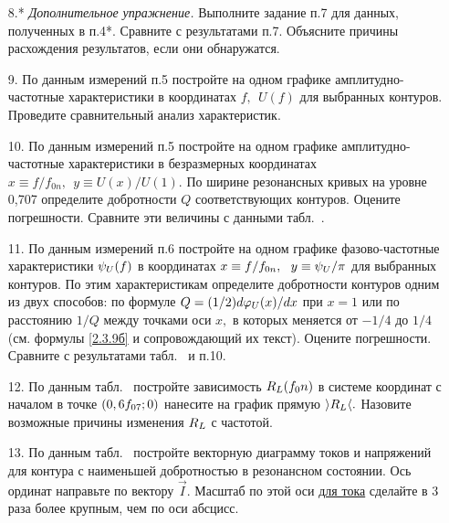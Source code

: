 \begin{lab:task}
\begin{enumerate}
Оцените относительный вклад активных потерь в конденсаторах, представленных в табл.~. сопротивлением $R_{\sc{S}\text{max}},$ рассчитанным для максимального значения $\tg\delta=10^{-3},$ в суммарное активное сопротивление контура.

\item[8.*] \emph{Дополнительное упражнение.} Выполните задание п.7 для данных, полученных в п.4*. Сравните с результатами п.7. Объясните причины расхождения результатов, если они обнаружатся.

\item[9.] По данным измерений п.5 постройте на одном графике амплитудно-частотные характеристики в координатах $f,~~U(f)$   для выбранных контуров. Проведите сравнительный анализ характеристик.

\item[10.] По данным измерений п.5 постройте на одном графике амплитудно-частотные характеристики в безразмерных координатах $x\equiv f/f_{0n},~~y\equiv U(x)/U(1).$ По ширине резонансных кривых на уровне 0,707 определите добротности $Q$ соответствующих контуров. Оцените погрешности. Сравните эти величины с данными табл.~.

\item[11.] По данным измерений п.6 постройте на одном графике фазово-частотные характеристики $\psi_{\sc{U}}(f)$ в координатах $x\equiv f/f_{0n},~~y\equiv\psi_{\sc{U}}/\pi$ для выбранных контуров. По этим характеристикам определите добротности контуров одним из двух способов: по формуле $Q=(1/2)d\varphi_{\sc{U}}(x)/dx$ при $x=1$ или по расстоянию $1/Q$ между точками оси $x,$ в которых  меняется от $-1/4$ до $1/4$ (см. формулы \eqref{2.3.9б} и сопровождающий их текст). Оцените погрешности. Сравните с результатами табл.~ и п.10.

\item[12.] По данным табл.~ постройте зависимость $R_{\sc{L}}(f_{\sc{0}}n)$ в системе координат с началом в точке $(0,6f_{\sc{07}};0)$ нанесите на график прямую $\rangle R_{\sc{L}}\langle .$ Назовите возможные причины изменения $R_{\sc{L}}$ с частотой.

\item[13.] По данным табл.~ постройте векторную диаграмму токов и напряжений для контура с наименьшей добротностью в резонансном состоянии. Ось ординат направьте по вектору $\vec I.$ Масштаб по этой оси \underline{для тока} сделайте в 3 раза более крупным, чем по оси абсцисс.
	\end{enumerate}
\end{lab:task}

